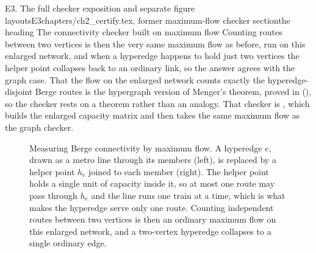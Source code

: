 \begin{offcut}{E3. The full checker exposition and separate figure layouts}{E3}{chapters/ch2\_certify.tex, former maximum-flow checker section}{the heading The connectivity checker built on maximum flow}
Counting routes between two vertices is then the very same maximum flow as before, run on this enlarged network, and when a hyperedge happens to hold just two vertices the helper point collapses back to an ordinary link, so the answer agrees with the graph case. That the flow on the enlarged network counts exactly the hyperedge-disjoint Berge routes is the hypergraph version of Menger's theorem, proved in  (), so the checker rests on a theorem rather than an analogy. That checker is , which builds the enlarged capacity matrix and then takes the same maximum flow as the graph checker.

\begin{figure}[ht]
\centering
{}
\caption{Measuring Berge connectivity by maximum flow. A hyperedge $e$, drawn as a metro line through its members (left), is replaced by a helper point $h_e$ joined to each member (right). The helper point holds a single unit of capacity inside it, so at most one route may pass through $h_e$ and the line runs one train at a time, which is what makes the hyperedge serve only one route. Counting independent routes between two vertices is then an ordinary maximum flow on this enlarged network, and a two-vertex hyperedge collapses to a single ordinary edge.}
\end{figure}


\end{offcut}
